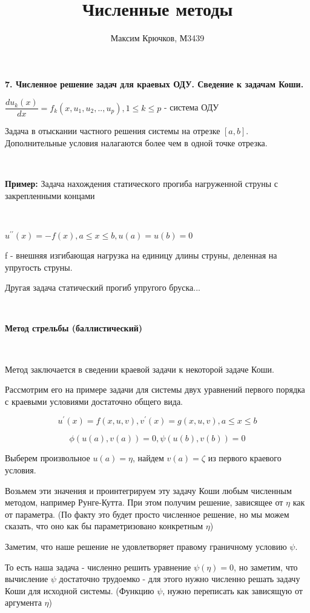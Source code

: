 \documentclass{article}
\author{Максим Крючков, М3439}
\title{Численные методы}
\newenvironment{para}[1]
{\begin{Large}
\textbf{#1}
\end{Large}
\vspace{0.5cm}}
{\vspace{1cm}}
\begin{document}


\begin{para}{7. Численное решение задач для краевых ОДУ. Сведение к задачам Коши.}

$\dfrac{du_k(x)}{dx} = f_k(x, u_1, u_2, .. , u_p), 1 \leq k \leq p$ - система ОДУ

Задача в отыскании частного решения системы на отрезке $[a, b]$. Дополнительные условия налагаются более чем в одной точке отрезка.

~\

\textbf{Пример:} Задача нахождения статического прогиба нагруженной струны с закрепленными концами

~\

$u^{\prime \prime}(x) = -f(x), a \leq x \leq b, u(a) = u(b) = 0$

f - внешняя изгибающая нагрузка на единицу длины струны, деленная на упругость струны. 

Другая задача статический прогиб упругого бруска...


~\

\textbf{Метод стрельбы (баллистический)}

~\

Метод заключается в сведении краевой задачи к некоторой задаче Коши.

Рассмотрим его на примере задачи для системы двух уравнений первого порядка с краевыми условиями достаточно общего вида.

$$u^\prime (x) = f(x, u, v), v^\prime (x) = g(x, u, v), a \leq x \leq b$$

$$\phi (u(a), v(a)) = 0, \psi (u(b), v(b)) = 0$$

Выберем произвольное $u(a) = \eta$, найдем $v(a) = \zeta$ из первого краевого условия.

Возьмем эти значения и проинтегрируем эту задачу Коши любым численным методом, например Рунге-Кутта. При этом получим решение, зависящее от $\eta$ как от параметра. (По факту это будет просто численное решение, но мы можем сказать, что оно как бы параметризовано конкретным $\eta$)

Заметим, что наше решение не удовлетворяет правому граничному условию $\psi$.

То есть наша задача - численно решить уравнение $\psi(\eta) = 0$, но заметим, что вычисление $\psi$ достаточно трудоемко - для этого нужно численно решать задачу Коши для исходной системы. (Функцию $\psi$, нужно переписать как зависящую от аргумента $\eta$)


\end{para}
\end{document}

